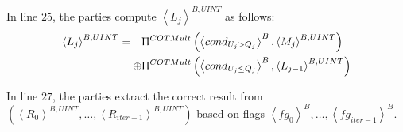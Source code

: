      In line $25$, the parties compute $ \left\langle {L_{j}}\right\rangle^{B,UINT}$ as follows:
      \begin{equation}
            \label{eq:ISLeftPointline25}
            \begin{split}
                  \left\langle {L_{j}}\right\rangle^{B,UINT}= \quad & \Uppi^{COTMult}\left( \left\langle cond_{U_{j}> Q_{j}}\right\rangle ^{B} , \left\langle {M_j}\right\rangle ^{B,UINT}\right)\\
                  \oplus  & \Uppi^{COTMult}\left(\left\langle cond_{U_{j}\leq Q_{j}}\right\rangle ^{B} , \left\langle{ L_{j-1}}\right\rangle^{B,UINT}\right)
            \end{split}
      \end{equation}

      In line $27$, the parties extract the correct result from $\left(\left\langle {R_0}\right\rangle ^{B,UINT} ,\ldots ,\left\langle {R_{iter-1}}\right\rangle ^{B,UINT}\right) $ based on flags $\left\langle fg_0\right\rangle ^{B},\ldots,\left\langle fg_{iter-1}\right\rangle ^{B}$.

